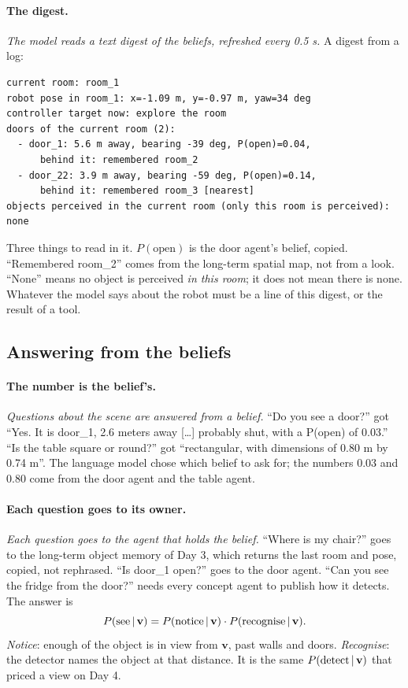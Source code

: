 \documentclass[11pt]{article}
\newcommand{\slt}[1]{\emph{#1}}   %
\begin{document}
\paragraph{The digest.} \slt{The model reads a text digest of the beliefs, refreshed every 0.5 s.} A digest from a log:
\begin{lstlisting}[language={}]
current room: room_1
robot pose in room_1: x=-1.09 m, y=-0.97 m, yaw=34 deg
controller target now: explore the room
doors of the current room (2):
  - door_1: 5.6 m away, bearing -39 deg, P(open)=0.04,
      behind it: remembered room_2
  - door_22: 3.9 m away, bearing -59 deg, P(open)=0.14,
      behind it: remembered room_3 [nearest]
objects perceived in the current room (only this room is perceived): none
\end{lstlisting}
Three things to read in it. $P(\text{open})$ is the door agent's belief, copied. ``Remembered room\_2'' comes from the long-term spatial map, not from a look. ``None'' means no object is perceived \emph{in this room}; it does not mean there is none. Whatever the model says about the robot must be a line of this digest, or the result of a tool.

\subsection{Answering from the beliefs}

\paragraph{The number is the belief's.} \slt{Questions about the scene are answered from a belief.} ``Do you see a door?'' got ``Yes. It is door\_1, 2.6 meters away [\ldots] probably shut, with a P(open) of 0.03.'' ``Is the table square or round?'' got ``rectangular, with dimensions of 0.80 m by 0.74 m''. The language model chose which belief to ask for; the numbers 0.03 and 0.80 come from the door agent and the table agent.

\paragraph{Each question goes to its owner.} \slt{Each question goes to the agent that holds the belief.} ``Where is my chair?'' goes to the long-term object memory of Day 3, which returns the last room and pose, copied, not rephrased. ``Is door\_1 open?'' goes to the door agent. ``Can you see the fridge from the door?'' needs every concept agent to publish how it detects. The answer is
\[
P(\text{see}\,|\,\mathbf v)=P(\text{notice}\,|\,\mathbf v)\cdot P(\text{recognise}\,|\,\mathbf v).
\]
\emph{Notice}: enough of the object is in view from $\mathbf v$, past walls and doors. \emph{Recognise}: the detector names the object at that distance. It is the same $P(\text{detect}\,|\,\mathbf v)$ that priced a view on Day 4.
\end{document}

